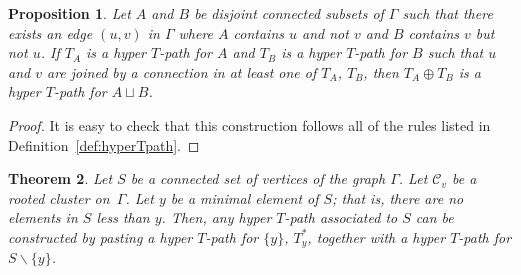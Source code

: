\documentclass[pdftex]{sigma}
\numberwithin{equation}{section}
\newtheorem{Theorem}{Theorem}[section]
\newtheorem{Proposition}[Theorem]{Proposition}
 { \theoremstyle{definition}
\newtheorem{Definition}[Theorem]{Definition}
\newtheorem{Note}[Theorem]{Note}
\newtheorem{Example}[Theorem]{Example}
\newtheorem{Remark}[Theorem]{Remark} }
\begin{document}
\begin{Proposition}\label{prop:pasting}
Let $A$ and $B$ be disjoint connected subsets of $\Gamma$ such that there exists an edge $(u,v)$ in $\Gamma$ where $A$ contains $u$ and not $v$ and $B$ contains $v$ but not $u$. If $T_A$ is a hyper $T$-path for $A$ and $T_B$ is a hyper $T$-path for $B$ such that $u$ and $v$ are joined by a connection in at least one of $T_A$, $T_B$, then $T_A\oplus T_B$ is a hyper $T$-path for $A \sqcup B$.
\end{Proposition}
\begin{proof}
It is easy to check that this construction follows all of the rules listed in Defini\-tion~\ref{def:hyperTpath}.
\end{proof}
\begin{Theorem}\label{thm:CanPeelSingleton}
Let $S$ be a connected set of vertices of the graph $\Gamma$. Let $\mathcal{C}_v$ be a rooted cluster on~$\Gamma$. Let $y$ be a minimal element of $S$; that is, there are no elements in $S$ less than $y$. Then, any hyper $T$-path associated to $S$ can be constructed by pasting a hyper $T$-path for $\{ y \}$, $T_{y}^*$, together with a hyper $T$-path for $S \backslash \{ y \}$.
\end{Theorem}
\end{document}
